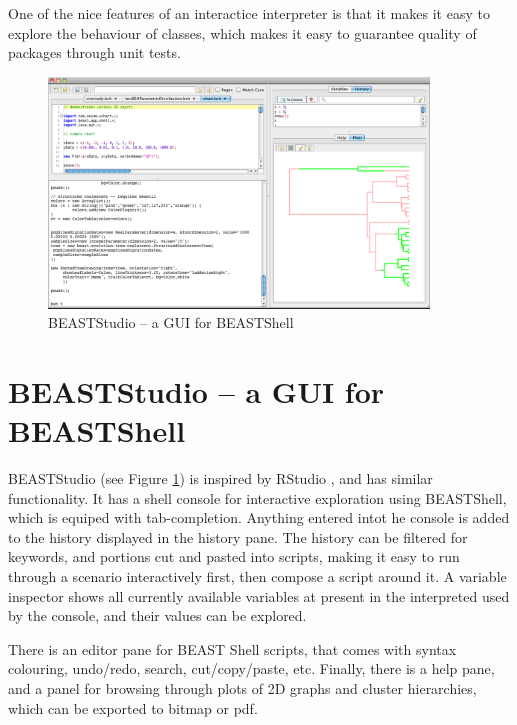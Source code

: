 \documentclass[twoside,11pt]{article}
\begin{document}
One of the nice features of an interactice interpreter is that it makes it easy to explore the behaviour of classes, which makes it easy to guarantee quality of packages through unit tests.


\begin{figure}
\begin{center}
\includegraphics[width=0.9\textwidth]{BEASTStudio}
\end{center}
\caption{\label{fig.BEASTStudio}BEASTStudio -- a GUI for BEASTShell}
\end{figure}


\section{BEASTStudio -- a GUI for BEASTShell}

BEASTStudio (see Figure \ref{fig.BEASTStudio}) is inspired by RStudio \citep{rstudio}, and has similar functionality. It has a shell console for interactive exploration using BEASTShell, which is equiped with tab-completion. Anything entered intot he console is added to the history displayed in the history pane. The history can be filtered for keywords, and portions cut and pasted into scripts, making it easy to run through a scenario interactively first, then compose a script around it. A variable inspector shows all currently available variables at present in the interpreted used by the console, and their values can be explored.

There is an editor pane for BEAST Shell scripts, that comes with syntax colouring, undo/redo, search, cut/copy/paste, etc. Finally, there is a help pane, and a panel for browsing through plots of 2D graphs and cluster hierarchies, which can be exported to bitmap or pdf.

\end{document}
